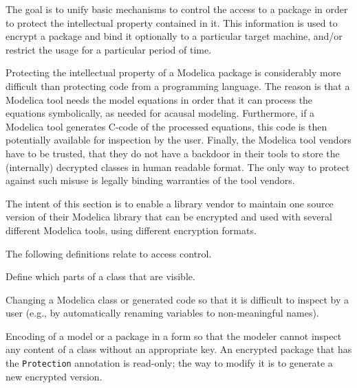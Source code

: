 The goal is to unify basic mechanisms to control the access to a package in order to protect the intellectual property contained in it.
This information is used to encrypt a package and bind it optionally to a particular target machine, and/or restrict the usage for a particular period of time.

\begin{nonnormative}
Protecting the intellectual property of a Modelica package is considerably more difficult than protecting code from a programming language.
The reason is that a Modelica tool needs the model equations in order that it can process the equations symbolically, as needed for acausal modeling.
Furthermore, if a Modelica tool generates C-code of the processed equations, this code is then potentially available for inspection by the user.
Finally, the Modelica tool vendors have to be trusted, that they do not have a backdoor in their tools to store the (internally) decrypted classes in human readable format.
The only way to protect against such misuse is legally binding warranties of the tool vendors.

The intent of this section is to enable a library vendor to maintain one source version of their Modelica library that can be encrypted and used with several different Modelica tools, using different encryption formats.
\end{nonnormative}

The following definitions relate to access control.

\begin{definition}[Protection]
Define which parts of a class that are visible.
\end{definition}

\begin{definition}[Obfuscation]
Changing a Modelica class or generated code so that it is difficult to inspect by a user (e.g., by automatically renaming variables to non-meaningful names).
\end{definition}

\begin{definition}[Encryption]
Encoding of a model or a package in a form so that the modeler cannot inspect any content of a class without an appropriate key.
An encrypted package that has the \lstinline!Protection! annotation is read-only; the way to modify it is to generate a new encrypted version.
\end{definition}

